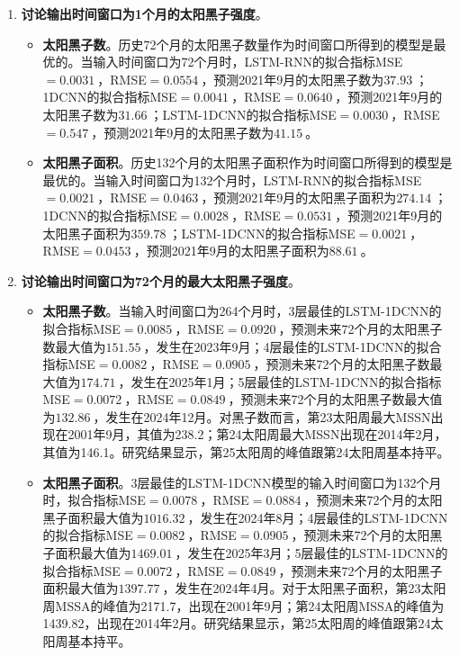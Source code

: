 \begin{enumerate}
    \begin{enumerate}
      \item \textbf{讨论输出时间窗口为1个月的太阳黑子强度}。
      \begin{itemize}
        \item \textbf{太阳黑子数}。历史72个月的太阳黑子数量作为时间窗口所得到的模型是最优的。当输入时间窗口为72个月时，LSTM-RNN的拟合指标MSE$=\SI{0.0031}{}$，RMSE$=\SI{0.0554}{}$，预测2021年9月的太阳黑子数为$\SI{37.93}{}$；1DCNN的拟合指标MSE$=\SI{0.0041}{}$，RMSE$=\SI{0.0640}{}$，预测2021年9月的太阳黑子数为$\SI{31.66}{}$；LSTM-1DCNN的拟合指标MSE$=\SI{0.0030}{}$，RMSE$=\SI{0.547}{}$，预测2021年9月的太阳黑子数为$\SI{41.15}{}$。
        \item \textbf{太阳黑子面积}。历史132个月的太阳黑子面积作为时间窗口所得到的模型是最优的。当输入时间窗口为132个月时，LSTM-RNN的拟合指标MSE$=\SI{0.0021}{}$，RMSE$=\SI{0.0463}{}$，预测2021年9月的太阳黑子面积为$\SI{274.14}{}$；1DCNN的拟合指标MSE$=\SI{0.0028}{}$，RMSE$=\SI{0.0531}{}$，预测2021年9月的太阳黑子面积为$\SI{359.78}{}$；LSTM-1DCNN的拟合指标MSE$=\SI{0.0021}{}$，RMSE$=\SI{0.0453}{}$，预测2021年9月的太阳黑子面积为$\SI{88.61}{}$。
      \end{itemize}
      \item \textbf{讨论输出时间窗口为72个月的最大太阳黑子强度}。
      \begin{itemize}
        \item \textbf{太阳黑子数}。当输入时间窗口为264个月时，3层最佳的LSTM-1DCNN的拟合指标MSE$=\SI{0.0085}{}$，RMSE$=\SI{0.0920}{}$，预测未来72个月的太阳黑子数最大值为$\SI{151.55}{}$，发生在2023年9月；4层最佳的LSTM-1DCNN的拟合指标MSE$=\SI{0.0082}{}$，RMSE$=\SI{0.0905}{}$，预测未来72个月的太阳黑子数最大值为$\SI{174.71}{}$，发生在2025年1月；5层最佳的LSTM-1DCNN的拟合指标MSE$=\SI{0.0072}{}$，RMSE$=\SI{0.0849}{}$，预测未来72个月的太阳黑子数最大值为$\SI{132.86}{}$，发生在2024年12月。对黑子数而言，第23太阳周最大MSSN出现在2001年9月，其值为238.2；第24太阳周最大MSSN出现在2014年2月，其值为146.1。研究结果显示，第25太阳周的峰值跟第24太阳周基本持平。 
        \item \textbf{太阳黑子面积}。3层最佳的LSTM-1DCNN模型的输入时间窗口为132个月时，拟合指标MSE$=\SI{0.0078}{}$，RMSE$=\SI{0.0884}{}$，预测未来72个月的太阳黑子面积最大值为$\SI{1016.32}{}$，发生在2024年8月；4层最佳的LSTM-1DCNN的拟合指标MSE$=\SI{0.0082}{}$，RMSE$=\SI{0.0905}{}$，预测未来72个月的太阳黑子面积最大值为$\SI{1469.01}{}$，发生在2025年3月；5层最佳的LSTM-1DCNN的拟合指标MSE$=\SI{0.0072}{}$，RMSE$=\SI{0.0849}{}$，预测未来72个月的太阳黑子面积最大值为$\SI{1397.77}{}$，发生在2024年4月。对于太阳黑子面积，第23太阳周MSSA的峰值为2171.7，出现在2001年9月；第24太阳周MSSA的峰值为1439.82，出现在2014年2月。研究结果显示，第25太阳周的峰值跟第24太阳周基本持平。 
      \end{itemize}
    \end{enumerate}
    

\end{enumerate}
